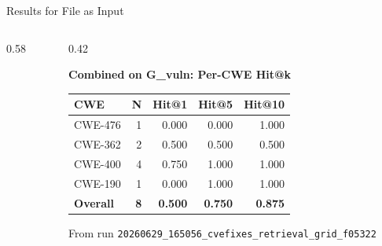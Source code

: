 \documentclass[aspectratio=169,10pt]{beamer}
\newcommand{\chit}[1]{\cellcolor{hit!30} #1}
\begin{document}
\begin{frame}{Results for File as Input }
\begin{columns}[T]
\begin{column}{0.58\textwidth}
\begin{tcolorbox}[colback=warn!5, colframe=warn!70!black, boxrule=0.35pt,
    left=3pt, right=3pt, top=2pt, bottom=1pt, arc=2pt, width=\linewidth]
  \end{tcolorbox}

    \end{column}
    \begin{column}{0.42\textwidth}

  \begin{center}
  {\small\textbf{Combined on G\_vuln: Per-CWE Hit@k}}\\[4pt]
  {\scriptsize
  \renewcommand{\arraystretch}{1.25}
  \setlength{\tabcolsep}{3.2pt}
  \begin{tabular}{lrrrr}
    \toprule
    \textbf{CWE} & \textbf{N} & \textbf{Hit@1} & \textbf{Hit@5} & \textbf{Hit@10} \\
    \midrule
    CWE-476 & 1 & 0.000 & 0.000 & \chit{1.000} \\
    CWE-362 & 2 & \chit{0.500} & \chit{0.500} & 0.500 \\
    CWE-400 & 4 & \chit{0.750} & \chit{1.000} & \chit{1.000} \\
    CWE-190 & 1 & 0.000 & \chit{1.000} & \chit{1.000} \\
    \midrule
    \textbf{Overall} & \textbf{8} & \textbf{0.500} & \textbf{0.750} & \textbf{0.875} \\
    \bottomrule
  \end{tabular}}

  \vspace{0.2em}
  {\scriptsize\textcolor{notecol}{From run \texttt{20260629\_165056\_cvefixes\_retrieval\_grid\_f05322}}}
  \end{center}
    \end{column}
  \end{columns}
\end{frame}
\end{document}
